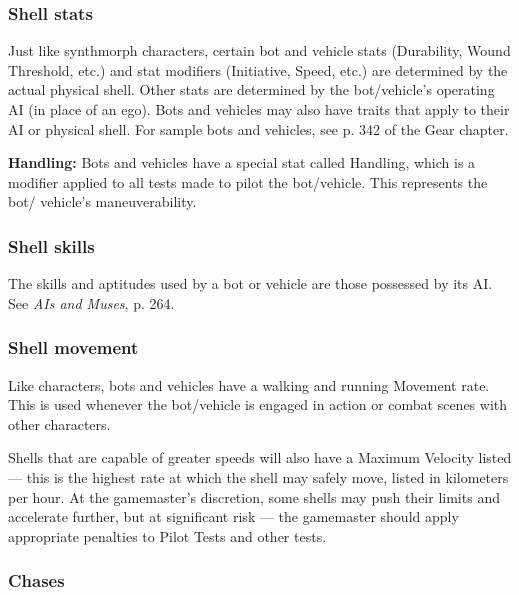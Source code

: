 \subsubsection{Shell stats}

Just like synthmorph characters, certain bot and vehicle stats (Durability, Wound Threshold, etc.) and stat modifiers (Initiative, Speed, etc.) are determined by the actual physical shell. Other stats are determined by the bot/vehicle’s operating AI (in place of an ego). Bots and vehicles may also have traits that apply to their AI or physical shell. For sample bots and vehicles, see p. 342 of the Gear chapter.

\textbf{Handling:} Bots and vehicles have a special stat called Handling, which is a modifier applied to all tests made to pilot the bot/vehicle. This represents the bot/ vehicle’s maneuverability.

\subsubsection{Shell skills}

The skills and aptitudes used by a bot or vehicle are those possessed by its AI. See \emph{AIs and Muses}, p. 264.

\subsubsection{Shell movement}

Like characters, bots and vehicles have a walking and running Movement rate. This is used whenever the bot/vehicle is engaged in action or combat scenes with other characters.

Shells that are capable of greater speeds will also have a Maximum Velocity listed --- this is the highest rate at which the shell may safely move, listed in kilometers per hour. At the gamemaster’s discretion, some shells may push their limits and accelerate further, but at significant risk --- the gamemaster should apply appropriate penalties to Pilot Tests and other tests.

\subsubsection{Chases}

